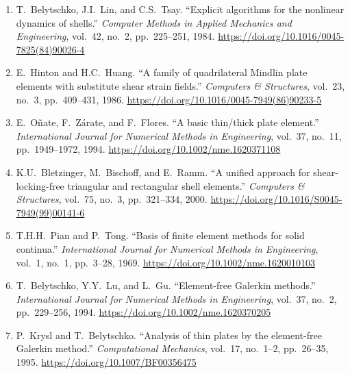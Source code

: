 \documentclass[a4paper,10pt]{article}
\begin{document}
\begin{enumerate}
    \item \label{belytschko1984}
    T.~Belytschko, J.I.~Lin, and C.S.~Tsay.
    ``Explicit algorithms for the nonlinear dynamics of shells.''
    \emph{Computer Methods in Applied Mechanics and Engineering},
    vol.~42, no.~2, pp.~225--251, 1984.
    \newline \url{https://doi.org/10.1016/0045-7825(84)90026-4}

    \item \label{hinton1986}
    E.~Hinton and H.C.~Huang.
    ``A family of quadrilateral Mindlin plate elements with substitute shear 
    strain fields.''
    \emph{Computers \& Structures}, vol.~23, no.~3, pp.~409--431, 1986.
    \newline \url{https://doi.org/10.1016/0045-7949(86)90233-5}

    \item \label{onate1994}
    E.~O\~nate, F.~Z\'arate, and F.~Flores.
    ``A basic thin/thick plate element.''
    \emph{International Journal for Numerical Methods in Engineering},
    vol.~37, no.~11, pp.~1949--1972, 1994.
    \newline \url{https://doi.org/10.1002/nme.1620371108}

    \item \label{bletzinger2000}
    K.U.~Bletzinger, M.~Bischoff, and E.~Ramm.
    ``A unified approach for shear-locking-free triangular and rectangular shell 
    elements.''
    \emph{Computers \& Structures}, vol.~75, no.~3, pp.~321--334, 2000.
    \newline \url{https://doi.org/10.1016/S0045-7949(99)00141-6}

    \item \label{pian1969}
    T.H.H.~Pian and P.~Tong.
    ``Basis of finite element methods for solid continua.''
    \emph{International Journal for Numerical Methods in Engineering},
    vol.~1, no.~1, pp.~3--28, 1969.
    \newline \url{https://doi.org/10.1002/nme.1620010103}

    \item \label{belytschko1994}
    T.~Belytschko, Y.Y.~Lu, and L.~Gu.
    ``Element-free Galerkin methods.''
    \emph{International Journal for Numerical Methods in Engineering},
    vol.~37, no.~2, pp.~229--256, 1994.
    \newline \url{https://doi.org/10.1002/nme.1620370205}

    \item \label{krysl1995}
    P.~Krysl and T.~Belytschko.
    ``Analysis of thin plates by the element-free Galerkin method.''
    \emph{Computational Mechanics}, vol.~17, no.~1--2, pp.~26--35, 1995.
    \newline \url{https://doi.org/10.1007/BF00356475}


\end{enumerate}
\end{document}
